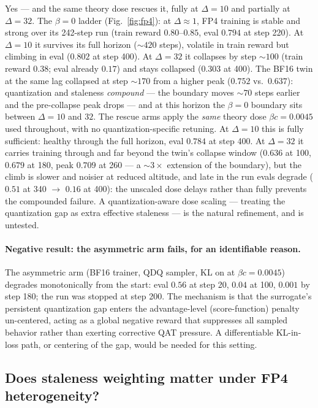 \documentclass[11pt]{amsart}
\begin{document}
Yes --- and the same theory dose rescues it, fully at $\Delta{=}10$ and
partially at $\Delta{=}32$. The $\beta{=}0$ ladder (Fig.~\ref{fig:fp4}): at
$\Delta{\approx}1$, FP4 training is stable and strong over its 242-step run
(train reward $0.80$--$0.85$, eval $0.794$ at step 220). At $\Delta{=}10$ it
survives its full horizon (${\sim}420$ steps), volatile in train reward but
climbing in eval ($0.802$ at step 400). At $\Delta{=}32$ it collapses by
step ${\sim}100$ (train reward $0.38$; eval already $0.17$) and stays
collapsed ($0.303$ at 400). The BF16 twin at the same lag collapsed at step
${\sim}170$ from a higher peak ($0.752$ vs.\ $0.637$): quantization and
staleness \emph{compound} --- the boundary moves ${\sim}70$ steps earlier
and the pre-collapse peak drops --- and at this horizon the $\beta{=}0$
boundary sits between $\Delta{=}10$ and $32$. The rescue arms apply the
\emph{same} theory dose $\beta c = 0.0045$ used throughout, with no
quantization-specific retuning. At $\Delta{=}10$ this is fully sufficient:
healthy through the full horizon, eval $0.784$ at step 400. At
$\Delta{=}32$ it carries training through and far beyond the twin's collapse
window ($0.636$ at 100, $0.679$ at 180, peak $0.709$ at 260 --- a
${\sim}3\times$ extension of the boundary), but the climb is slower and
noisier at reduced altitude, and late in the run evals degrade ($0.51$ at
340 $\to$ $0.16$ at 400): the unscaled dose delays rather than fully
prevents the compounded failure. A quantization-aware dose scaling ---
treating the quantization gap as extra effective staleness --- is the
natural refinement, and is untested.

\paragraph{Negative result: the asymmetric arm fails, for an identifiable
reason.} The asymmetric arm (BF16 trainer, QDQ sampler, KL on at
$\beta c = 0.0045$) degrades monotonically from the start: eval $0.56$ at
step 20, $0.04$ at 100, $0.001$ by step 180; the run was stopped at step
200. The mechanism is that the surrogate's persistent quantization gap
enters the advantage-level (score-function) penalty un-centered, acting as a
global negative reward that suppresses all sampled behavior rather than
exerting corrective QAT pressure. A differentiable KL-in-loss path, or
centering of the gap, would be needed for this setting.

\subsection{Does staleness weighting matter under FP4 heterogeneity?}
\label{sec:fp4hetero}
\end{document}
